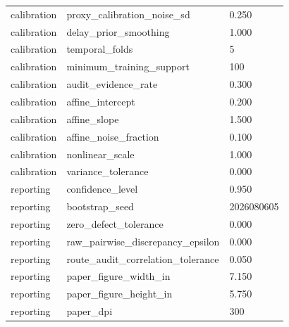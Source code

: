 \begin{table}[t]
\begin{tabular}{lll}
calibration & proxy_calibration_noise_sd & 0.250 \\
calibration & delay_prior_smoothing & 1.000 \\
calibration & temporal_folds & 5 \\
calibration & minimum_training_support & 100 \\
calibration & audit_evidence_rate & 0.300 \\
calibration & affine_intercept & 0.200 \\
calibration & affine_slope & 1.500 \\
calibration & affine_noise_fraction & 0.100 \\
calibration & nonlinear_scale & 1.000 \\
calibration & variance_tolerance & 0.000 \\
reporting & confidence_level & 0.950 \\
reporting & bootstrap_seed & 2026080605 \\
reporting & zero_defect_tolerance & 0.000 \\
reporting & raw_pairwise_discrepancy_epsilon & 0.000 \\
reporting & route_audit_correlation_tolerance & 0.050 \\
reporting & paper_figure_width_in & 7.150 \\
reporting & paper_figure_height_in & 5.750 \\
reporting & paper_dpi & 300 \\
\bottomrule
\end{tabular}
\end{table}
